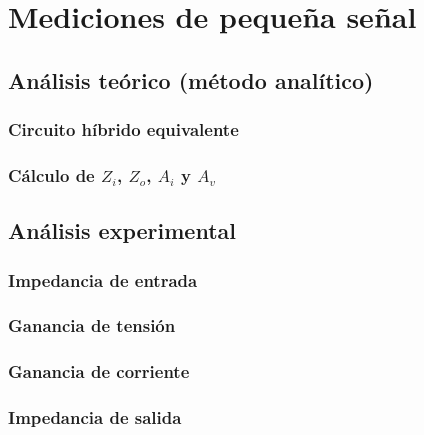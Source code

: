 \chapter{Mediciones de pequeña señal}
  \section{Análisis teórico (método analítico)}
    \subsection{Circuito híbrido equivalente}
    \subsection{Cálculo de $Z_i$, $Z_o$, $A_i$ y $A_v$}
  \section{Análisis experimental}
    \subsection{Impedancia de entrada}
    \subsection{Ganancia de tensión}
    \subsection{Ganancia de corriente}
    \subsection{Impedancia de salida}
